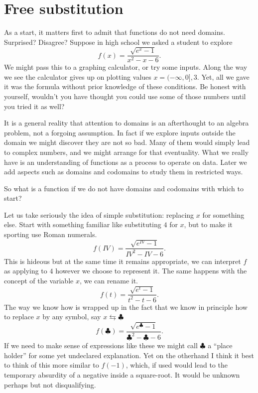 \section{Free substitution}
As a start, it matters first to admit that functions do not need 
domains.  Surprised? Disagree?    Suppose in high school we asked 
a student to  explore
\[
    f(x) = \frac{\sqrt{e^x-1}}{x^2-x-6}.
\]
We might pass this to a graphing calculator, or try some inputs. Along the way
we see the calculator gives up on plotting values $x=(-\infty,0],3$.  Yet, all
we gave it was the formula without prior knowledge of these conditions.  
Be honest with yourself, wouldn't you have thought you could use some of 
those numbers until you tried it as well?

It is a general reality that attention to domains is an af\-ter\-thought to an
algebra problem, not a forgoing assumption.  In fact if we explore inputs
outside the domain we might discover they are not so bad.  Many of them would
simply lead to complex numbers, and we might arrange for that eventuality.  
What we really have is an understanding of functions as a process to operate 
on data.  Later  we add aspects such as domains and codomains to study them in restricted ways.

So what is a function if we do not have domains and codomains with which to start?

Let us take seriously the idea of simple substitution: replacing $x$ for something else.
Start with something familiar like substituting $4$ for $x$, but to make 
it sporting use Roman numerals.
\[
    f(IV) = \frac{\sqrt{e^{IV}-1}}{IV^2-IV-6}.
\]
This is hideous but at the same time it remains appropriate, we can interpret 
$f$ as applying to $4$ however we choose to represent it.  The same happens with 
the concept of the variable $x$, we can rename it.
\[
    f(t) = \frac{\sqrt{e^{t}-1}}{t^2-t-6}.
\]
The way we know how is wrapped up in the fact that we know 
in principle how to replace $x$ by any symbol, say $x\leftrightarrows \clubsuit$
\[
    f(\clubsuit) = \frac{\sqrt{e^{\clubsuit}-1}}{\clubsuit^2-\clubsuit-6}.
\]
If we need to make sense of expressions like these we might call $\clubsuit$ 
a ``place holder'' for some yet undeclared explanation.  Yet on the otherhand 
I think it best to think of this more similar to  $f(-1)$, which, if used 
would lead to the temporary absurdity of a negative inside a square-root.
It would be unknown perhaps but not disqualifying.

